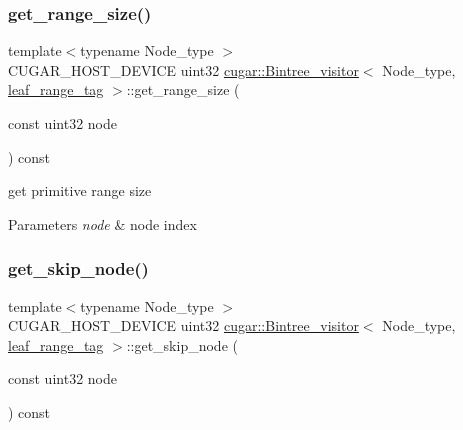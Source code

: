 \subsubsection{\texorpdfstring{get\+\_\+range\+\_\+size()}{get\_range\_size()}}
{\footnotesize\ttfamily template$<$typename Node\+\_\+type $>$ \\
C\+U\+G\+A\+R\+\_\+\+H\+O\+S\+T\+\_\+\+D\+E\+V\+I\+CE uint32 \hyperlink{structcugar_1_1_bintree__visitor}{cugar\+::\+Bintree\+\_\+visitor}$<$ Node\+\_\+type, \hyperlink{structcugar_1_1leaf__range__tag}{leaf\+\_\+range\+\_\+tag} $>$\+::get\+\_\+range\+\_\+size (\begin{DoxyParamCaption}\item[{const uint32}]{node }\end{DoxyParamCaption}) const\hspace{0.3cm}{\ttfamily [inline]}}

get primitive range size


\begin{DoxyParams}{Parameters}
{\em node} & node index \\
\hline
\end{DoxyParams}
\mbox{\label{structcugar_1_1_bintree__visitor_3_01_node__type_00_01leaf__range__tag_01_4_a70b5db6f62a3b8e709679d353e3d0482}} 
\subsubsection{\texorpdfstring{get\+\_\+skip\+\_\+node()}{get\_skip\_node()}}
{\footnotesize\ttfamily template$<$typename Node\+\_\+type $>$ \\
C\+U\+G\+A\+R\+\_\+\+H\+O\+S\+T\+\_\+\+D\+E\+V\+I\+CE uint32 \hyperlink{structcugar_1_1_bintree__visitor}{cugar\+::\+Bintree\+\_\+visitor}$<$ Node\+\_\+type, \hyperlink{structcugar_1_1leaf__range__tag}{leaf\+\_\+range\+\_\+tag} $>$\+::get\+\_\+skip\+\_\+node (\begin{DoxyParamCaption}\item[{const uint32}]{node }\end{DoxyParamCaption}) const\hspace{0.3cm}{\ttfamily [inline]}}

